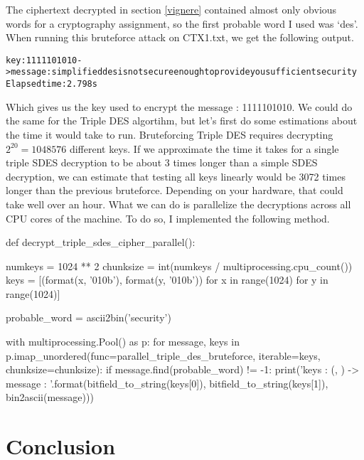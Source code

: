 \documentclass{article}
\begin{document}
The ciphertext decrypted in section \ref{vignere} contained almost only obvious words for a cryptography assignment, so the first probable word I used was `des'. 
When running this bruteforce attack on CTX1.txt, we get the following output.

\begin{alltt}
    key : 1111101010 -> message : simplifieddesisnotsecureenoughtoprovideyousufficientsecurity
    Elapsed time : 2.798s
\end{alltt}

Which gives us the key used to encrypt the message : 1111101010. We could do the same for the Triple DES algortihm, but let's first do some estimations about the time it would take to run. Bruteforcing Triple DES requires decrypting $2^{20} = 1 048 576$ different keys. If we approximate the time it takes for a single triple SDES decryption to be about 3 times longer than a simple SDES decryption, we can estimate that testing all keys linearly would be 3072 times longer than the previous bruteforce. Depending on your hardware, that could take well over an hour. What we can do is parallelize the decryptions across all CPU cores of the machine. To do so, I implemented the following method.

\bigskip
\begin{python}
    def decrypt_triple_sdes_cipher_parallel():

    numkeys = 1024 ** 2
    chunksize = int(numkeys / multiprocessing.cpu_count())
    keys = [(format(x, '010b'), format(y, '010b')) for x in range(1024) for y in range(1024)]

    probable_word = ascii2bin('security')

    with multiprocessing.Pool() as p:
        for message, keys in p.imap_unordered(func=parallel_triple_des_bruteforce, iterable=keys, chunksize=chunksize):
            if message.find(probable_word) != -1:
                print('keys : ({}, {}) -> message : {}'.format(bitfield_to_string(keys[0]), bitfield_to_string(keys[1]), bin2ascii(message)))
\end{python}
\bigskip


\section{Conclusion}




\end{document}
